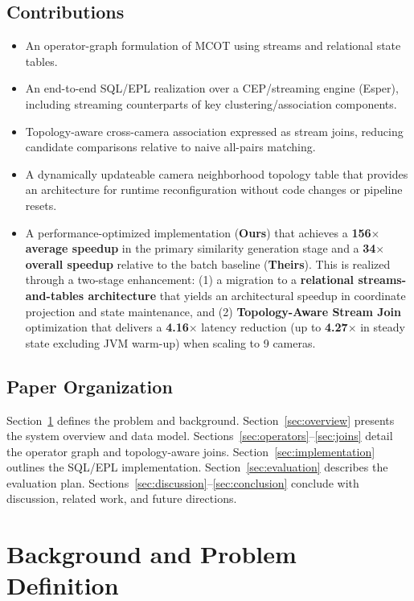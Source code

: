 \documentclass[11pt]{article}
\begin{document}
\subsection{Contributions}
\begin{itemize}[leftmargin=*]
    \item An operator-graph formulation of MCOT using streams and relational state tables.
    \item An end-to-end SQL/EPL realization over a CEP/streaming engine (Esper), including streaming counterparts of key clustering/association components.
    \item Topology-aware cross-camera association expressed as stream joins, reducing candidate comparisons relative to naive all-pairs matching.
    \item A dynamically updateable camera neighborhood topology table that provides an architecture for runtime reconfiguration without code changes or pipeline resets.
    \item A performance-optimized implementation (\textbf{Ours}) that achieves a \textbf{156$\times$ average speedup} in the primary similarity generation stage and a \textbf{34$\times$ overall speedup} relative to the batch baseline (\textbf{Theirs}). This is realized through a two-stage enhancement: (1) a migration to a \textbf{relational streams-and-tables architecture} that yields an architectural speedup in coordinate projection and state maintenance, and (2) \textbf{Topology-Aware Stream Join} optimization that delivers a \textbf{4.16$\times$} latency reduction (up to \textbf{4.27$\times$} in steady state excluding JVM warm-up) when scaling to 9 cameras.
\end{itemize}

\subsection{Paper Organization}
Section~\ref{sec:background} defines the problem and background. Section~\ref{sec:overview} presents the system overview and data model. Sections~\ref{sec:operators}--\ref{sec:joins} detail the operator graph and topology-aware joins. Section~\ref{sec:implementation} outlines the SQL/EPL implementation. Section~\ref{sec:evaluation} describes the evaluation plan. Sections~\ref{sec:discussion}--\ref{sec:conclusion} conclude with discussion, related work, and future directions.

\section{Background and Problem Definition}\label{sec:background}
\end{document}
